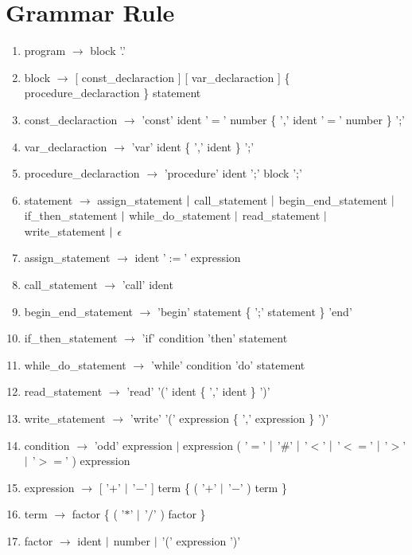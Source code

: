 \documentclass[11pt]{article}
\begin{document}
\section{Grammar Rule}
\begin{enumerate}
 \item program $\longrightarrow$ block '.'
 \item block $\longrightarrow$ [ const\_declaraction ] [ var\_declaraction ] \{ procedure\_declaraction \} statement
 \item const\_declaraction $\longrightarrow$ 'const' ident '$=$' number \{ ',' ident '$=$' number \} ';'
 \item var\_declaraction $\longrightarrow$ 'var' ident \{ ',' ident \} ';'
 \item procedure\_declaraction $\longrightarrow$ 'procedure' ident ';' block ';'
 \item statement $\longrightarrow$ assign\_statement $\arrowvert$ call\_statement $\arrowvert$  begin\_end\_statement $\arrowvert$  if\_then\_statement $\arrowvert$  while\_do\_statement $\arrowvert$  read\_statement $\arrowvert$  write\_statement $\arrowvert$  $\epsilon$
 \item assign\_statement $\longrightarrow$ ident '$:=$' expression
 \item call\_statement $\longrightarrow$ 'call' ident
 \item begin\_end\_statement $\longrightarrow$ 'begin' statement \{ ';' statement \} 'end'
 \item if\_then\_statement $\longrightarrow$ 'if' condition 'then' statement
 \item while\_do\_statement $\longrightarrow$ 'while' condition 'do' statement
 \item read\_statement $\longrightarrow$ 'read' '(' ident \{ ',' ident \} ')'
 \item write\_statement $\longrightarrow$ 'write' '(' expression \{ ',' expression \} ')'
 \item condition $\longrightarrow$ 'odd' expression $|$ expression ( '$=$' $\arrowvert$  '$\#$' $\arrowvert$  '$<$' $\arrowvert$  '$<=$' $\arrowvert$  '$>$' $\arrowvert$  '$>=$' ) expression
 \item expression $\longrightarrow$ [ '$+$' $\arrowvert$  '$-$' ] term \{ ( '$+$' $\arrowvert$  '$-$' ) term \}
 \item term $\longrightarrow$ factor \{ ( '$*$' $\arrowvert$  '$/$' ) factor \}
 \item factor $\longrightarrow$ ident $\arrowvert$  number $\arrowvert$  '(' expression ')'
\end{enumerate}
\end{document}
